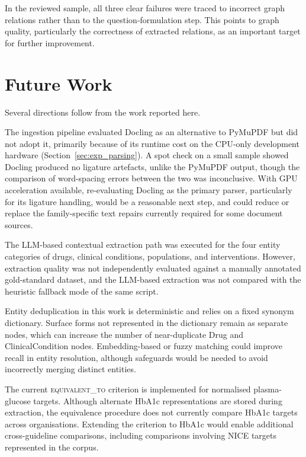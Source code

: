 In the reviewed sample, all three clear failures were traced to incorrect
graph relations rather than to the question-formulation step. This points to graph quality, particularly the correctness of extracted relations, as an important target for further improvement.

\section{Future Work}

Several directions follow from the work reported here.

The ingestion pipeline evaluated Docling as an alternative to PyMuPDF but did
not adopt it, primarily because of its runtime cost on the CPU-only development
hardware (Section~\ref{sec:exp_parsing}). A spot check on a small sample showed
Docling produced no ligature artefacts, unlike the PyMuPDF output, though the
comparison of word-spacing errors between the two was inconclusive. With GPU
acceleration available, re-evaluating Docling as the primary parser,
particularly for its ligature handling, would be a reasonable next step, and
could reduce or replace the family-specific text repairs currently required for
some document sources.

The LLM-based contextual extraction path was executed for the four entity categories of drugs, clinical conditions, populations, and interventions. However, extraction quality was not independently evaluated against a manually annotated gold-standard dataset, and the LLM-based extraction was not compared with the heuristic fallback mode of the same script.

Entity deduplication in this work is deterministic and relies on a fixed
synonym dictionary. Surface forms not represented in the dictionary remain
as separate nodes, which can increase the number of near-duplicate Drug and
ClinicalCondition nodes. Embedding-based or fuzzy matching could improve
recall in entity resolution, although safeguards would be needed to avoid
incorrectly merging distinct entities.

The current \textsc{equivalent\_to} criterion is implemented for normalised
plasma-glucose targets. Although alternate HbA1c representations are stored
during extraction, the equivalence procedure does not currently compare
HbA1c targets across organisations. Extending the criterion to HbA1c would
enable additional cross-guideline comparisons, including comparisons
involving NICE targets represented in the corpus.

